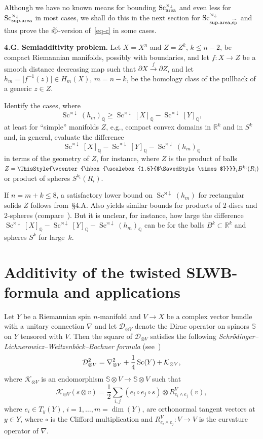 \documentclass[10pt,a4paper]{amsart}
\numberwithin{equation}{section}
\newcommand\bigtimes{\mathbin{\ThisStyle{\vcenter{\hbox{%
\scalebox{1.5}{$\SavedStyle\times$}}}}}}
\begin{document}
Although we have no known means for bounding $\operatorname{Sc}_{\rm area}^{\rtimes_\downarrow}$ and even less for $\operatorname{Sc}_{{\rm sup.area}}^{\rtimes_\downarrow}$ in most cases, we shall
do this in the next section for $\operatorname{Sc}_{{\rm sup.area}, \widetilde{\rm sp}}^{\rtimes_\downarrow}$ and thus prove
the $\widetilde{\rm sp}$-version of~\eqref{eq-c}
in some cases.

\textbf{4.G. Semiadditivity problem.} Let $ X=X^n$ and $Z=Z^k$, $k\leq n-2$, be compact Riemannian manifolds, possibly with boundaries,
and let $f\colon X\to Z$ be a smooth distance decreasing map such that $\partial X\overset {f}\to\partial Z$,
and let $h_m=\bigl[f^{-1}(z)\bigr]\in H_m(X)$, $m=n-k$, be the homology class of the pullback of a generic $z\in Z$.

Identify the cases, where
\[
\operatorname{Sc}^{\rtimes\downarrow}(h_m)_{\mathbb Q}\geq \operatorname{Sc}^{\rtimes\downarrow}[X]_{\mathbb Q} - \operatorname{Sc}^{\rtimes\downarrow}[Y]_{\mathbb Q} ,
\]
at least for ``simple'' manifolds $Z$, e.g.,
compact convex domains in $\mathbb R^k$ and in $S^k$ and, in general,
evaluate the difference
\[
\operatorname{Sc}^{\rtimes\downarrow}[X]_{\mathbb Q} -\operatorname{Sc}^{\rtimes\downarrow}[Y]_{\mathbb Q} -\operatorname{Sc}^{\rtimes\downarrow}(h_m)_{\mathbb Q}
\]
in terms of the geometry of $Z$, for instance, where $Z$ is the product of balls $Z=\bigtimes_iB^{k_i}(R_i)$ or product of spheres $S^{k_i}(R_i)$.

If $n=m+k\leq 8$, a satisfactory lower bound on $\operatorname{Sc}^{\rtimes\downarrow}(h_m)$
 for rectangular solids $Z$ follows from~\S4.A.
 Also \cite[\S2.B]{Gr2023} yields similar bounds for products of 2-discs and 2-spheres
(compare~\cite{GZ2021}). But it is unclear, for instance, how large the difference $\operatorname{Sc}^{\rtimes\downarrow}[X]_{\mathbb Q} -\operatorname{Sc}^{\rtimes\downarrow}[Y]_{\mathbb Q} -\operatorname{Sc}^{\rtimes\downarrow}(h_m)_{\mathbb Q}$
can be for the balls $B^k\subset \mathbb R^k$ and spheres $S^k$ for large~$k$.


\section{Additivity of the twisted SLWB-formula and applications}\label{section5}

Let $Y$ be a Riemannian spin $n$-manifold and $V\to X$ be a complex vector bundle with a unitary connection $\nabla$ and let $\mathcal D_{\otimes V}$ denote
the Dirac operator on spinors $\mathbb S$ on $Y$ tensored with $V$. Then the square of $\mathcal D_{\otimes V}$ satisfies the following
 {\it Schr\"odinger--Lichnerowicz--Weitzenb\"ock--Bochner formula} (see~\cite{LM1989})
\[
{\cal D}_{\otimes V}^2=\nabla^2_{\otimes V} + \frac{1}{4}\operatorname{Sc}(Y) + {\cal K}_{\otimes V},
\]
where $\mathcal K_{\otimes V}$ is an endomorphism
$\mathbb S\otimes V\to \mathbb S\otimes V $ such that
\[
\mathcal K_{\otimes V}(s\otimes v)=\frac {1}{2}\sum_{i,j}(e_i\circ e_j\circ s) \otimes R^V_{e_i\wedge e_j}(v),
\]
where $e_i\in T_y(Y) $, $i=1,\dots,m=\dim(Y)$, are orthonormal tangent vectors at $y\in Y$, where
 $\circ$ is the Clifford multiplication and $R^V_{e_i\wedge e_j}\colon V\to V$ is the curvature operator of $\nabla$.
\end{document}
